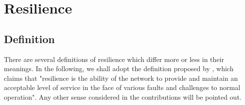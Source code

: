 \documentclass[a4paper,10pt]{article}
\begin{document}
\section{Resilience}
\subsection{Definition}
There are several definitions of resilience which differ more or less in their meanings. In the following, we shall adopt the definition proposed by \cite{StHu07}, which claims that   "resilience is the ability of the network to provide and maintain an acceptable level of service in the face of various faults and challenges to normal operation".  Any other sense considered in the contributions will be pointed out.

 




\end{document}
